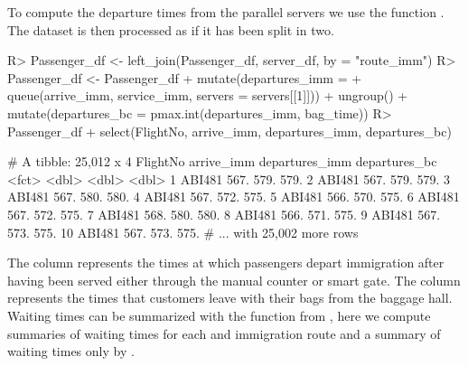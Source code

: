 \documentclass[article]{jss}
\begin{document}
%
To compute the departure times from the parallel servers we use the
 function . The dataset is then processed as
if it has been split in two.
%
\begin{CodeChunk}
\begin{Sinput}
R> Passenger_df <- left_join(Passenger_df, server_df, by = "route_imm")
R> Passenger_df <- Passenger_df %
+    mutate(departures_imm = 
+      queue(arrive_imm, service_imm, servers = servers[[1]])) %
+    ungroup() %
+    mutate(departures_bc = pmax.int(departures_imm, bag_time))
R> Passenger_df %
+    select(FlightNo, arrive_imm, departures_imm, departures_bc)
\end{Sinput}
\begin{Soutput}
# A tibble: 25,012 x 4
   FlightNo arrive_imm departures_imm departures_bc
   <fct>         <dbl>          <dbl>         <dbl>
 1 ABI481         567.           579.          579.
 2 ABI481         567.           579.          579.
 3 ABI481         567.           580.          580.
 4 ABI481         567.           572.          575.
 5 ABI481         566.           570.          575.
 6 ABI481         567.           572.          575.
 7 ABI481         568.           580.          580.
 8 ABI481         566.           571.          575.
 9 ABI481         567.           573.          575.
10 ABI481         567.           573.          575.
# ... with 25,002 more rows
\end{Soutput}
\end{CodeChunk}
%
The column  represents the times at which
passengers depart immigration after having been served either through
the manual counter or smart gate. The column 
represents the times that customers leave with their bags from the
baggage hall. Waiting times can be summarized with the
 function from , here we compute summaries
of waiting times for each  and immigration route
 and a summary of waiting times only by
.
%
\end{document}
